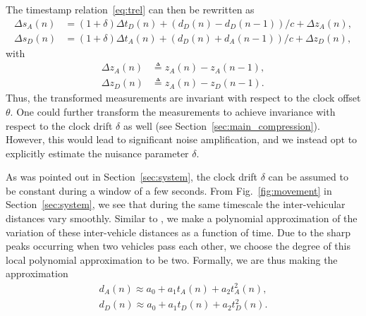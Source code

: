 \documentclass[12pt,journal,final,onecolumn]{IEEEtran}
\newcommand{\defeq}{\mathrel{\triangleq}}
\theoremstyle{definition}
\theoremstyle{myremark}
\newcommand{\dtd}{\Delta t_D}
\newcommand{\dta}{\Delta t_A}
\newcommand{\dsd}{\Delta s_D}
\newcommand{\dsa}{\Delta s_A}
\begin{document}
The timestamp relation~\eqref{eq:trel} can then be rewritten as
\begin{subequations}
    \label{eq:dtrel}
    \begin{align}
        \dsa(n)
        & = (1+\delta)\dtd(n)+(d_D(n)-d_D(n-1))/c+\Delta z_A(n), \\
        \dsd(n) 
        & = (1+\delta)\dta(n)+(d_D(n)+d_A(n-1))/c+\Delta z_D(n), 
    \end{align}
\end{subequations}
with
\begin{subequations}
    \label{eq:dz}
    \begin{align}
        \Delta z_A(n) & \defeq z_A(n)-z_A(n-1), \\
        \Delta z_D(n) & \defeq z_A(n)-z_D(n-1).
    \end{align}
\end{subequations}
Thus, the transformed measurements are invariant with respect to the clock
offset $\theta$.  One could further transform the measurements to achieve
invariance with respect to the clock drift $\delta$ as well (see
Section~\ref{sec:main_compression}).  However, this would lead to significant
noise amplification, and we instead opt to explicitly estimate the nuisance
parameter $\delta$.

As was pointed out in Section~\ref{sec:system}, the clock drift $\delta$ can be
assumed to be constant during a window of a few seconds. From
Fig.~\ref{fig:movement} in Section~\ref{sec:system}, we see that during the same
timescale the inter-vehicular distances vary smoothly. Similar to
\cite{rajan2012joint}, we make a polynomial approximation of the variation of
these inter-vehicle distances as a function of time.  Due to the sharp peaks
occurring when two vehicles pass each other, we choose the degree of this local
polynomial approximation to be two. Formally, we are thus making the
approximation
\begin{subequations}
    \label{eq:poly}
    \begin{align}
        d_A(n) \approx a_0+a_1t_A(n)+a_2t_A^2(n), \\
        d_D(n) \approx a_0+a_1t_D(n)+a_2t_D^2(n).
    \end{align}
\end{subequations}
\end{document}
